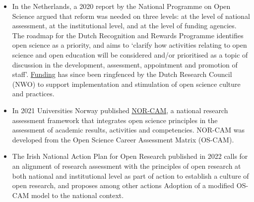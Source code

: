 \documentclass[
  letterpaper,
  DIV=11,
  numbers=noendperiod,
  oneside]{scrreprt}
\begin{document}
\begin{tcolorbox}[enhanced jigsaw, titlerule=0mm, coltitle=black, toprule=.15mm, title=\textcolor{quarto-callout-note-color}{\faInfo}\hspace{0.5em}{Open research in other national research assessment frameworks}, colframe=quarto-callout-note-color-frame, bottomrule=.15mm, opacityback=0, leftrule=.75mm, rightrule=.15mm, arc=.35mm, toptitle=1mm, colbacktitle=quarto-callout-note-color!10!white, opacitybacktitle=0.6, bottomtitle=1mm, breakable, left=2mm, colback=white]

\begin{itemize}
\item
  In the Netherlands, a 2020 report by the National Programme on Open
  Science argued that reform was needed on three levels: at the level of
  national assessment, at the institutional level, and at the level of
  funding agencies. The roadmap for the Dutch Recognition and Rewards
  Programme identifies open science as a priority, and aims to `clarify
  how activities relating to open science and open education will be
  considered and/or prioritised as a topic of discussion in the
  development, assessment, appointment and promotion of
  staff'.\footnotemark{}
  \href{https://www.nwo.nl/en/researchprogrammes/open-science/open-science-fund}{Funding}
  has since been ringfenced by the Dutch Research Council (NWO) to
  support implementation and stimulation of open science culture and
  practices.
\item
  In 2021 Universities Norway published
  \href{https://www.uhr.no/en/news-from-uhr/nor-cam-a-toolbox-for-recognition-and-rewards-in-academic-careers.5780.aspx}{NOR-CAM},
  a national research assessment framework that integrates open science
  principles in the assessment of academic results, activities and
  competencies. NOR-CAM was developed from the Open Science Career
  Assessment Matrix (OS-CAM).\footnotemark{}
\item
  The Irish National Action Plan for Open Research published in 2022
  calls for an alignment of research assessment with the principles of
  open research at both national and institutional level as part of
  action to establish a culture of open research, and proposes among
  other actions Adoption of a modified OS-CAM model to the national
  context.\footnotemark{}\\
\end{itemize}

\end{tcolorbox}
\end{document}
